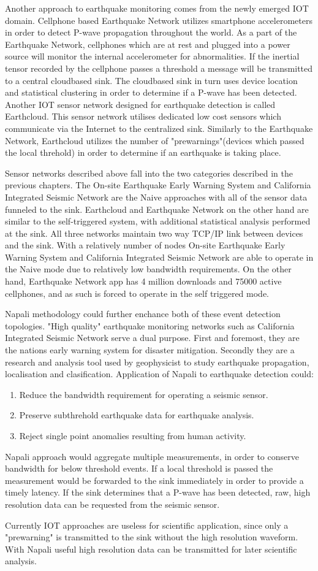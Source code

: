 Another approach to earthquake monitoring comes from the newly emerged IOT domain.
Cellphone based Earthquake Network \cite{finazzi2017statistical} utilizes smartphone accelerometers in order to detect P-wave propagation throughout the world.
As a part of the Earthquake Network, cellphones which are at rest and plugged into a power source will monitor the internal accelerometer for abnormalities.
If the inertial tensor recorded by the cellphone passes a threshold a message will be transmitted to a central cloudbased sink.
The cloudbased sink in turn uses device location and statistical clustering in order to determine if a P-wave has been detected.
Another IOT sensor network designed for earthquake detection is called Earthcloud.\cite{klapez2018first}
This sensor network utilises dedicated low cost sensors which communicate via the Internet to the centralized sink.
Similarly to the Earthquake Network, Earthcloud utilizes the number of "prewarnings"(devices which passed the local threhold) in order to determine if an earthquake is taking place.

Sensor networks described above fall into the two categories described in the previous chapters.
The On-site Earthquake Early Warning System and California Integrated Seismic Network are the Naive approaches with all of the sensor data funneled to the sink.
Earthcloud and Earthquake Network on the other hand are similar to the self-triggered system, with additional statistical analysis performed at the sink.
All three networks maintain two way TCP/IP link between devices and the sink.
With a relatively number of nodes On-site Earthquake Early Warning System and California Integrated Seismic Network are able to operate in the Naive mode due to relatively low bandwidth requirements.
On the other hand, Earthquake Network app has 4 million downloads and 75000 active cellphones, and as such is forced to operate in the self triggered mode.

Napali methodology could further enchance both of these event detection topologies.
"High quality" earthquake monitoring networks such as California Integrated Seismic Network serve a dual purpose.
First and foremost, they are the nations early warning system for disaster mitigation.
Secondly they are a research and analysis tool used by geophysicist to study earthquake propagation, localisation and clasification.
Application of Napali to earthquake detection could:
\begin{enumerate}
    \item Reduce the bandwidth requirement for operating a seismic sensor.
    \item Preserve subthrehold earthquake data for earthquake analysis.
    \item Reject single point anomalies resulting from human activity.
\end{enumerate}
Napali approach would aggregate multiple measurements, in order to conserve bandwidth for below threshold events.
If a local threshold is passed the measurement would be forwarded to the sink immediately in order to provide a timely latency.
If the sink determines that a P-wave has been detected, raw, high resolution data can be requested from the seismic sensor.

Currently IOT approaches are useless for scientific application, since only a "prewarning" is transmitted to the sink without the high resolution waveform.
With Napali useful high resolution data can be transmitted for later scientific analysis.